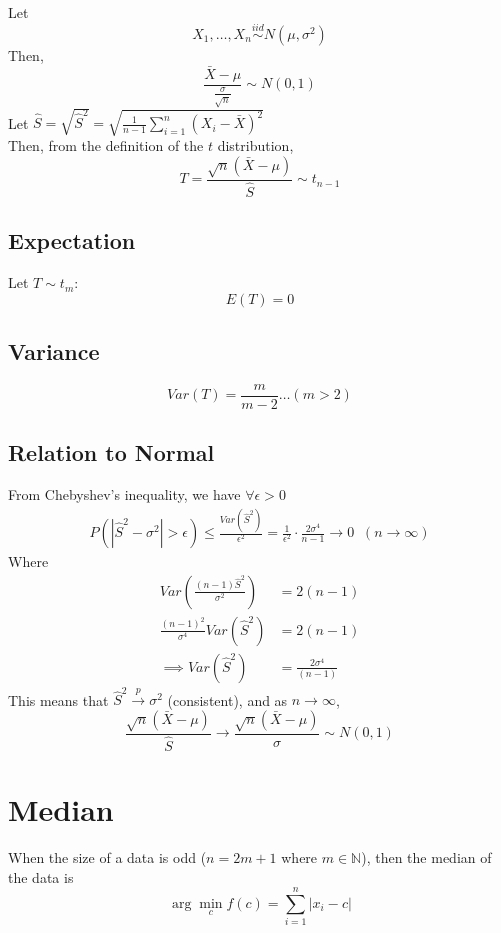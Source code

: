 \documentclass[
]{article}
\begin{document}
Let \[ X_1, \dots, X_n \stackrel{iid}{\sim}N(\mu, \sigma^2)\] Then,
\[\frac{\bar{X} - \mu}{\frac{\sigma}{\sqrt{n}}} \sim N(0, 1)\] Let
\(\hat{S} = \sqrt{\hat{S}^2} = \sqrt{\frac{1}{n-1}\sum_{i=1}^n(X_i - \bar{X})^2}\)\\
Then, from the definition of the \(t\) distribution,
\boldmath \[T= \frac{\sqrt{n}(\bar{X} - \mu)}{\hat{S}} \sim t_{n-1}\]\unboldmath

\hypertarget{expectation-1}{%
\subsection{Expectation}\label{expectation-1}}

Let \(T \sim t_m\): \[E(T) = 0\]

\hypertarget{variance-1}{%
\subsection{Variance}\label{variance-1}}

\[Var(T) = \frac{m}{m-2} \dots (m > 2)\]

\hypertarget{relation-to-normal}{%
\subsection{Relation to Normal}\label{relation-to-normal}}

From Chebyshev's inequality, we have \(\forall \epsilon > 0\)
\[\begin{aligned}
P(|\hat{S}^2 - \sigma^2| > \epsilon) \le \frac{Var(\hat{S}^2)}{\epsilon^2} = \frac{1}{\epsilon^2} \cdot \frac{2\sigma^4}{n-1}  \to 0 \;\;(n \to \infty)
\end{aligned}\] Where \[\begin{aligned}
Var\left(\frac{(n-1)\hat{S}^2}{\sigma^2}\right) &= 2(n-1) \\
\frac{(n-1)^2}{\sigma^4}Var(\hat{S}^2) &= 2(n-1) \\
\implies Var(\hat{S}^2) &= \frac{2\sigma^4}{(n-1)}
\end{aligned}\] This means that \(\hat{S}^2 \stackrel{p}{\to} \sigma^2\)
(consistent), and as \(n\to \infty\),
\[\frac{\sqrt{n}(\bar{X} - \mu)}{\hat{S}} \to \frac{\sqrt{n}(\bar{X} - \mu)}{\sigma} \sim N(0, 1)\]

\hypertarget{median}{%
\section{Median}\label{median}}

When the size of a data is odd (\(n = 2m+1\) where
\(m \in \mathbb{N}\)), then the median of the data is
\[\arg\min_c f(c) = \sum_{i=1}^n |x_i - c|\]
\end{document}
